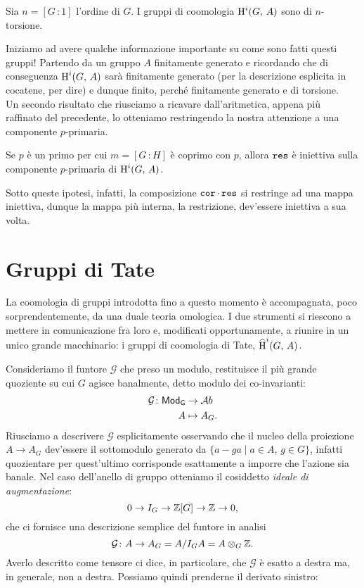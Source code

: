 \begin{corollary}
	Sia $ n = [G 	\,\colon 1] $ l'ordine di $ G $. I gruppi di coomologia $ \operatorname{H}^i(G, \, A) $ sono di $ n $-torsione.
\end{corollary}

Iniziamo ad avere qualche informazione importante su come sono fatti questi gruppi! Partendo da un gruppo $ A $ finitamente generato e ricordando che di conseguenza $ \operatorname{H}^i(G, \, A) $ sarà finitamente generato (per la descrizione esplicita in cocatene, per dire) e dunque finito, perché finitamente generato e di torsione. \\

Un secondo risultato che riusciamo a ricavare dall'aritmetica, appena più raffinato del precedente, lo otteniamo restringendo la nostra attenzione a una componente $ p $-primaria.

\begin{lemma}\label{injp}
	Se $ p $ è un primo per cui $ m = [G \, \colon H] $ è coprimo con $ p $, allora $ \operatorname{\mathtt{res}} $ è iniettiva sulla componente $ p $-primaria di $ \operatorname{H}^i(G, \, A) $.
\end{lemma}

Sotto queste ipotesi, infatti, la composizione $ \operatorname{\mathtt{cor}} \cdot \operatorname{\mathtt{res}} $ si restringe ad una mappa iniettiva, dunque la mappa più interna, la restrizione, dev'essere iniettiva a sua volta.

\section{Gruppi di Tate}
La coomologia di gruppi introdotta fino a questo momento è accompagnata, poco sorprendentemente, da una duale teoria omologica. I due strumenti si riescono a mettere in comunicazione fra loro e, modificati opportunamente, a riunire in un unico grande macchinario: i gruppi di coomologia di Tate, $ \operatorname{\widehat{H}}^i(G, \, A) $. \\


Consideriamo il funtore $ \mathcal{G} $ che preso un modulo, restituisce il più grande quoziente su cui $ G $ agisce banalmente, detto modulo dei co-invarianti:
\begin{align*} 
\mathcal{G} \colon \mathsf{Mod}_\mathsf{G} &\to \mathcal{A}b \\
A &\mapsto A_G.
\end{align*}
Riusciamo a descrivere $ \mathcal{G} $ esplicitamente osservando che il nucleo della proiezione $ A \to A_G $ dev'essere il sottomodulo generato da $ \{ a - ga \mid a \in A, \, g \in G \} $, infatti quozientare per quest'ultimo corrisponde esattamente a imporre che l'azione sia banale. Nel caso dell'anello di gruppo otteniamo il cosiddetto \emph{ideale di augmentazione}:
\[ 0 \to I_G \to \mathbb{Z}[G] \to \mathbb{Z} \to 0, \]
che ci fornisce una descrizione semplice del funtore in analisi
\[ \mathcal{G} \colon A \to A_G = A/I_GA = A \otimes_G \mathbb{Z}. \]
Averlo descritto come tensore ci dice, in particolare, che $ \mathcal{G} $ è esatto a destra ma, in generale, non a destra. Possiamo quindi prenderne il derivato sinistro:

